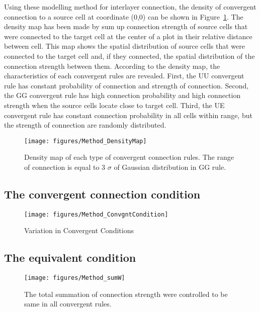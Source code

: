 Using these modelling method for interlayer connection, the density of convergent connection to a source cell at coordinate (0,0) can be shown in Figure~\ref{fig:DenseMap}. The density map has been made by sum up connection strength of source cells that were connected to the target cell at the center of a plot in their relative distance between cell. This map shows the spatial distribution of source cells that were connected to the target cell and, if they connected, the spatial distribution of the connection strength between them. According to the density map, the characteristics of each convergent rules are revealed. First, the UU convergent rule has constant probability of connection and strength of connection. Second, the GG convergent rule has high connection probability and high connection strength when the source cells locate close to target cell. Third, the UE convergent rule has constant connection probability in all cells within range, but the strength of connection are randomly distributed.



\begin{figure}[!h]
	\centering
	\texttt{[image: figures/Method\_DensityMap]}
	\caption{Density map of each type of convergent connection rules. The range of connection is equal to 3 $\sigma$ of Gaussian distribution in GG rule.}
	\label{fig:DenseMap}
\end{figure} 

\subsection{The convergent connection condition}

\begin{figure}[!h]
	\centering
	\texttt{[image: figures/Method\_ConvgntCondition]}
	\caption{Variation in Convergent Conditions}
	\label{fig:ConvergentConn}
\end{figure} 

\subsection{The equivalent condition}

\begin{figure}
	\centering
	\texttt{[image: figures/Method\_sumW]}
	\label{fig:ConSumW}
	\caption{The total summation of connection strength were controlled to be same in all convergent rules.}
\end{figure}

